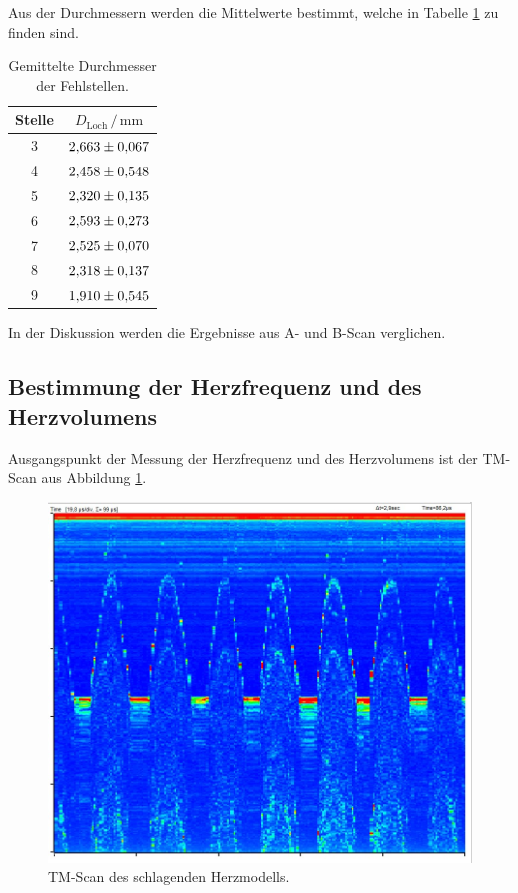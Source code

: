 Aus der Durchmessern werden die Mittelwerte bestimmt, welche in Tabelle \ref{tab:mess5} zu finden sind. 

\begin{table}
\centering
\caption{Gemittelte Durchmesser der Fehlstellen.}
\label{tab:mess5}
\begin{tabular}{c c}
\toprule
Stelle & $D_\text{Loch} \,/\, \si{\milli\meter}$\\
\midrule 
3 & $\num{2.663+-0.067}$\\
4 & $\num{2.458+-0.548}$\\
5 & $\num{2.320+-0.135}$\\
6 & $\num{2.593+-0.273}$\\
7 & $\num{2.525+-0.070}$\\
8 & $\num{2.318+-0.137}$\\
9 & $\num{1.910+-0.545}$\\
\bottomrule
\end{tabular}
\end{table}

In der Diskussion werden die Ergebnisse aus A- und B-Scan verglichen.

\subsection{Bestimmung der Herzfrequenz und des Herzvolumens}

Ausgangspunkt der Messung der Herzfrequenz und des Herzvolumens ist der TM-Scan aus 
Abbildung \ref{fig:tm}. 

\begin{figure}
  \centering
  \includegraphics[scale=0.3]{content/tm.jpg}
  \caption{TM-Scan des schlagenden Herzmodells.}
  \label{fig:tm}
\end{figure}


